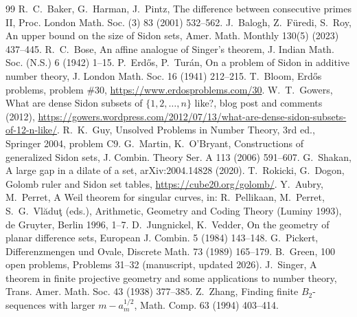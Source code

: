 \documentclass[11pt]{article}
\begin{document}
\begin{thebibliography}{99}
 R.~C.~Baker, G.~Harman, J.~Pintz, The difference between consecutive primes II, Proc. London Math. Soc. (3) 83 (2001) 532--562.
 J.~Balogh, Z.~F\"uredi, S.~Roy, An upper bound on the size of Sidon sets, Amer. Math. Monthly 130(5) (2023) 437--445.
 R.~C.~Bose, An affine analogue of Singer's theorem, J. Indian Math. Soc. (N.S.) 6 (1942) 1--15.
 P.~Erd\H{o}s, P.~Tur\'an, On a problem of Sidon in additive number theory, J. London Math. Soc. 16 (1941) 212--215.
 T.~Bloom, Erd\H{o}s problems, problem \#30, \url{https://www.erdosproblems.com/30}.
 W.~T.~Gowers, What are dense Sidon subsets of $\{1,2,\dots,n\}$ like?, blog post and comments (2012),
\url{https://gowers.wordpress.com/2012/07/13/what-are-dense-sidon-subsets-of-12-n-like/}.
 R.~K.~Guy, Unsolved Problems in Number Theory, 3rd ed., Springer 2004, problem C9.
 G.~Martin, K.~O'Bryant, Constructions of generalized Sidon sets, J. Combin. Theory Ser. A 113 (2006) 591--607.
 G.~Shakan, A large gap in a dilate of a set, arXiv:2004.14828 (2020).
 T.~Rokicki, G.~Dogon, Golomb ruler and Sidon set tables, \url{https://cube20.org/golomb/}.
 Y.~Aubry, M.~Perret, A Weil theorem for singular curves, in: R.~Pellikaan, M.~Perret, S.~G.~Vl\u{a}du\c{t} (eds.), Arithmetic, Geometry and Coding Theory (Luminy 1993), de Gruyter, Berlin 1996, 1--7.
 D.~Jungnickel, K.~Vedder, On the geometry of planar difference sets, European J. Combin. 5 (1984) 143--148.
 G.~Pickert, Differenzmengen und Ovale, Discrete Math. 73 (1989) 165--179.
 B.~Green, 100 open problems, Problems 31--32 (manuscript, updated 2026).
 J.~Singer, A theorem in finite projective geometry and some applications to number theory, Trans. Amer. Math. Soc. 43 (1938) 377--385.
 Z.~Zhang, Finding finite $B_2$-sequences with larger $m-a_m^{1/2}$, Math. Comp. 63 (1994) 403--414.
\end{thebibliography}
\end{document}
